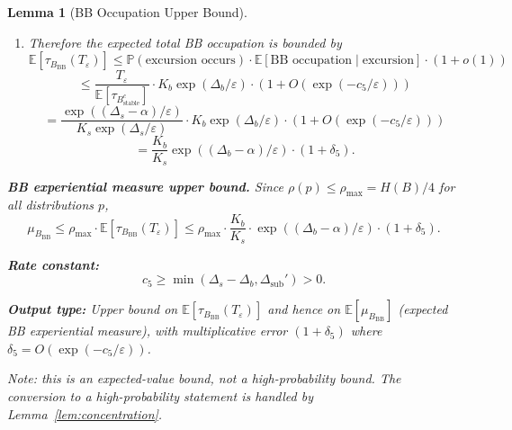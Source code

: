 \documentclass[11pt]{article}
\newtheorem{lemma}{Lemma}
\newcommand{\eps}{\varepsilon}
\newcommand{\Ds}{\Delta_s}
\newcommand{\Db}{\Delta_b}
\newcommand{\Bstable}{B_{\mathrm{stable}}}
\newcommand{\BBB}{B_{\mathrm{BB}}}
\newcommand{\Teps}{T_\eps}
\begin{document}
\begin{lemma}[BB Occupation Upper Bound]
\begin{enumerate}
\item Therefore the expected total BB occupation is bounded by
  \[
    \mathbb{E}[\tau_{\BBB}(\Teps)]
    \leq \mathbb{P}(\text{excursion occurs})
    \cdot \mathbb{E}[\text{BB occupation} \mid \text{excursion}]
    \cdot (1 + o(1))
  \]
  \[
    \leq \frac{\Teps}{\mathbb{E}[\tau_{\Bstable^c}]}
    \cdot K_b \exp(\Db/\eps) \cdot (1 + O(\exp(-c_5/\eps)))
  \]
  \[
    = \frac{\exp((\Ds - \alpha)/\eps)}{K_s \exp(\Ds/\eps)}
    \cdot K_b \exp(\Db/\eps)
    \cdot (1 + O(\exp(-c_5/\eps)))
  \]
  \begin{equation}\label{eq:bb-expected}
    = \frac{K_b}{K_s} \exp((\Db - \alpha)/\eps)
    \cdot (1 + \delta_5).
  \end{equation}
\end{enumerate}

\medskip
\textbf{BB experiential measure upper bound.}
Since $\rho(p) \leq \rho_{\max} = H(B)/4$ for all distributions $p$,
\begin{equation}\label{eq:mu-bb}
  \mu_{\BBB} \leq \rho_{\max} \cdot \mathbb{E}[\tau_{\BBB}(\Teps)]
  \leq \rho_{\max} \cdot \frac{K_b}{K_s}
  \cdot \exp((\Db - \alpha)/\eps) \cdot (1 + \delta_5).
\end{equation}

\medskip
\textbf{Rate constant:}
\begin{equation}\label{eq:c5}
  c_5 \geq \min(\Ds - \Db, \Delta_{\mathrm{sub}}') > 0.
\end{equation}

\medskip
\textbf{Output type:}
Upper bound on $\mathbb{E}[\tau_{\BBB}(\Teps)]$ and hence on
$\mathbb{E}[\mu_{\BBB}]$ (expected BB experiential measure), with
multiplicative error $(1 + \delta_5)$ where
$\delta_5 = O(\exp(-c_5/\eps))$.

Note: this is an expected-value bound, not a high-probability bound.
The conversion to a high-probability statement is handled by
Lemma~\ref{lem:concentration}.
\end{lemma}
\end{document}
